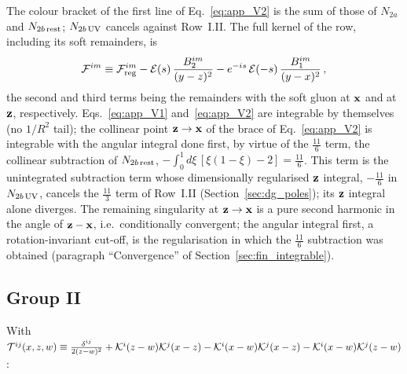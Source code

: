 The colour bracket of the first line of Eq.~\eqref{eq:app_V2} is the sum of those of $N_{2a}$ and $N_{2b\,\rm rest}$; $N_{2b\,\rm UV}$ cancels against Row~I.II. The full kernel of the row, including its soft remainders, is
\begin{align}\label{eq:app_F}
\mathcal F^{im}\equiv\mathcal F^{im}_{\rm reg}-\mathcal E(s)\,\frac{B_2^{im}}{(y-z)^2}-e^{-is}\,\mathcal E(-s)\,\frac{B_1^{im}}{(y-x)^2}\,,
\end{align}
the second and third terms being the remainders with the soft gluon at $\mathbf{x}$ and at $\mathbf{z}$, respectively. Eqs.~\eqref{eq:app_V1} and~\eqref{eq:app_V2} are integrable by themselves (no $1/R^2$ tail); the collinear point $\mathbf{z}\to\mathbf{x}$ of the brace of Eq.~\eqref{eq:app_V2} is integrable with the angular integral done first, by virtue of the $\frac{11}{6}$ term, the collinear subtraction of $N_{2b\,\rm rest}$, $-\int_0^1d\xi\,[\xi(1-\xi)-2]=\frac{11}{6}$. This term is the unintegrated subtraction term whose dimensionally regularised $\mathbf{z}$ integral, $-\frac{11}{6}$ in $N_{2b\,\rm UV}$, cancels the $\frac{11}{3}$ term of Row~I.II (Section~\ref{sec:dg_poles}); its $\mathbf{z}$ integral alone diverges. The remaining singularity at $\mathbf{z}\to\mathbf{x}$ is a pure second harmonic in the angle of $\mathbf{z}-\mathbf{x}$, i.e.\ conditionally convergent; the angular integral first, a rotation-invariant cut-off, is the regularisation in which the $\frac{11}{6}$ subtraction was obtained (paragraph ``Convergence'' of Section~\ref{sec:fin_integrable}).

\subsection{Group II}

With $\mathcal T^{ij}(x,z,w)\equiv\frac{\delta^{ij}}{2(z-w)^2}+\mathcal{K}^i(z-w)\mathcal{K}^j(x-z)-\mathcal{K}^i(x-w)\mathcal{K}^j(x-z)-\mathcal{K}^i(x-w)\mathcal{K}^j(z-w)$:

